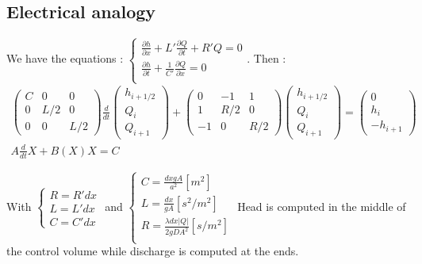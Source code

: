 \documentclass[../main.tex]{subfiles}
\begin{document}
\subsection{Electrical analogy}
We have the equations : $\begin{cases}
    \frac{\partial h}{\partial x} + L' \frac{\partial Q}{\partial t} + R' Q = 0\\
    \frac{\partial h}{\partial t} + \frac{1}{C'} \frac{\partial Q}{\partial x} = 0\\
\end{cases}$. Then : \begin{equation}
\begin{gathered}
    \begin{pmatrix}
        C & 0&0\\0 & L/2 &0\\0 & 0 & L/2
    \end{pmatrix} \frac{d}{dt} \begin{pmatrix}
        h_{i+1/2}\\Q_i\\ Q_{i+1}
    \end{pmatrix} + \begin{pmatrix}
        0&-1&1\\1&R/2&0\\
        -1&0&R/2
    \end{pmatrix} \begin{pmatrix}
        h_{i+1/2}\\Q_i\\ Q_{i+1}
    \end{pmatrix} = \begin{pmatrix}
        0\\ h_i\\-h_{i+1}
    \end{pmatrix}\\
    A\frac{d}{dt}X + B(X)X = C
    \end{gathered}
\end{equation}

With $\begin{cases}
    R = R'dx\\ L = L'dx\\ C=C'dx
\end{cases}$ and $\begin{cases}
    C=  \frac{dx g A}{a^2} [m^2]\\
    L = \frac{dx}{gA} [s^2/m^2]\\
    R = \frac{\lambda dx \lvert Q \rvert }{2gDA^2}[s/m^2]\\
\end{cases}$
\warning Head is computed in the middle of the control volume while discharge is computed at the ends.\\
\end{document}
